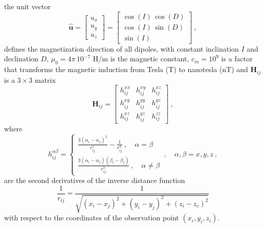 \documentclass[manuscript]{geophysics}
\begin{document}
	the unit vector
	\begin{equation}
		\hat{\mathbf{u}} = \begin{bmatrix}
			u_x \\
			u_y \\
			u_z
		\end{bmatrix} =
		\begin{bmatrix}
			\cos(I) \, \cos(D) \\
			\cos(I) \, \sin(D) \\
			\sin(I)
		\end{bmatrix} \: ,
		\label{eq:u_hat}
	\end{equation}
	defines the magnetization direction of all dipoles, with constant inclination $I$ and declination $D$,
	$\mu_{0} = 4\pi \, 10^{-7}$ H/m is the magnetic constant, $c_{m} = 10^{9}$ is a factor that transforms
	the magnetic induction from Tesla (T) to nanotesla (nT) and $\mathbf{H}_{ij}$ is a $3 \times 3$ matrix 
	\begin{equation}
		\mathbf{H}_{ij} = \begin{bmatrix}
			h^{xx}_{ij} & h^{xy}_{ij} & h^{xz}_{ij} \\
			h^{xy}_{ij} & h^{yy}_{ij} & h^{yz}_{ij} \\
			h^{xz}_{ij} & h^{yz}_{ij} & h^{zz}_{ij}
		\end{bmatrix} \: ,
		\label{eq:Hij}
	\end{equation}
	where 
	\begin{equation}
		h^{\alpha\beta}_{ij} = 
		\begin{cases}
			\frac{3 \left( \alpha_{i} - \alpha_{j} \right)^{2}}{r_{ij}^{5}} - \frac{1}{r_{ij}^{3}} \: , \quad \alpha = \beta \\
			\frac{3 \left( \alpha_{i} - \alpha_{j} \right) \left( \beta_{i} - \beta_{j} \right)}{r_{ij}^{5}} \: , \quad \alpha \ne \beta
		\end{cases} \: , \quad \alpha, \beta = x, y, z \: ,
		\label{eq:hij_alpha_beta}
	\end{equation}
	are the second derivatives of the inverse distance function
	\begin{equation}
		\frac{1}{r_{ij}} = 
		\frac{1}{\sqrt{\left(x_{i} - x_{j} \right)^{2} + 
				\left(y_{i} - y_{j} \right)^{2} + \left(z_{i} - z_{c} \right)^{2}}}
		\label{eq:1_rij}
	\end{equation}
	with respect to the coordinates of the observation point $(x_{i}, y_{i}, z_{i})$.
	
\end{document}
